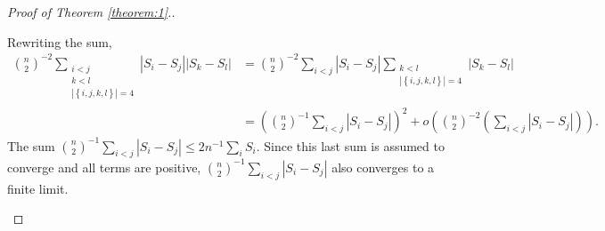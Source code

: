 \documentclass[12pt]{article}
\newtheorem{corollary}[theorem]{Corollary}
\newcommand{\y}{Y}
\newcommand{\s}{S}
\DeclareMathOperator{\diag}{diag}
\DeclareMathOperator{\E}{E}
\DeclareMathOperator{\V}{Var}
\begin{document}
\begin{proof}[Proof of Theorem \ref{theorem:1}.]
\begin{enumerate}[wide, labelwidth=!, labelindent=0pt]
    Rewriting the sum,
    \begin{align}
      {n\choose2}^{-2}\sum_{\substack{i<j\\k<l\\|\left\{i,j,k,l\right\}|=4}}|\s_i-\s_j||\s_k-\s_l| &=
                                                                                                     {n\choose2}^{-2}\sum_{i<j}|\s_i-\s_j|\sum_{\substack{k<l\\|\left\{i,j,k,l\right\}|=4}}|\s_k-\s_l|\\
      &=\left(      {n\choose2}^{-1}\sum_{i<j}|\s_i-\s_j|\right)^2 +       o\left({n\choose2}^{-2}\left(\sum_{i<j}|\s_i-\s_j|\right)\right).%
    \end{align}
    The sum ${n\choose2}^{-1}\sum_{i<j}|\s_i-\s_j|\le 2n^{-1}\sum_i\s_i$. Since this last sum is assumed to converge and all terms are positive, ${n\choose2}^{-1}\sum_{i<j}|\s_i-\s_j|$ also converges to a finite limit.
  \end{enumerate}
\end{proof}


\end{document}
